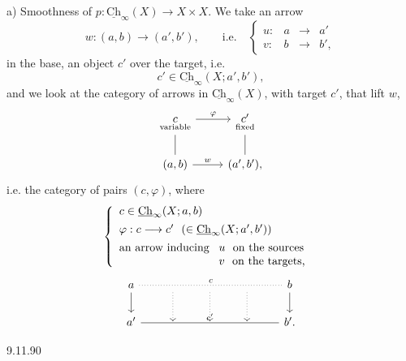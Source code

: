 \documentclass[11pt]{article}
\newcommand{\printedpage}[1]{\marginpar{\footnotesize p.~#1}}
\newcommand{\msp}[1]{\marginpar{\footnotesize [#1]}}
\newcommand{\Ch}{\underline{\mathrm{Ch}}}
\begin{document}
a) Smoothness of $p : \Ch_{\infty}(X) \longrightarrow X \times X$. We take an arrow
\[
w : (a,b) \longrightarrow (a',b'), \qquad \text{i.e.} \quad \left\{ \begin{array}{lccc} u : & a & \longrightarrow & a' \\[1ex] v : & b & \longrightarrow & b', \end{array} \right.
\]
in the base, an object $c'$ over the target, i.e.
\[
c' \in \Ch_{\infty}(X; a', b'),
\]
and we look at the category of arrows in $\Ch_{\infty}(X)$, with target $c'$, that lift $w$,
\[
\begin{tikzcd}
\underset{\text{\scriptsize variable}}{c} \arrow[r, "\varphi"] \arrow[d, dash] & \underset{\text{\scriptsize fixed}}{c'} \arrow[d, dash] \\
(a,b) \arrow[r, "w"] & (a',b'),
\end{tikzcd}
\]
\printedpage{90}
i.e. the category of pairs $(c,\varphi)$, where
\[
\left\{ \begin{array}{l}
c \in \Ch_{\infty}(X; a, b) \\[1ex]
\varphi : c \longrightarrow c' \ \ (\in \Ch_{\infty}(X; a', b')) \\[1ex]
\text{an arrow inducing } \begin{array}[t]{l} u \ \text{ on the sources} \\ v \ \text{ on the targets,} \end{array}
\end{array} \right.
\]
\[
\begin{tikzcd}
a \arrow[rrrr, dotted, dash, "c"] \arrow[d] & {} \arrow[d, dotted] & {} \arrow[d, dotted] & {} \arrow[d, dotted] & b \arrow[d] \\
a' \arrow[rrrr, dash, "c'"] & {} & {} & {} & b'.
\end{tikzcd}
\]

\msp{page 145}
\begin{flushright}
{\footnotesize 9.11.90}
\end{flushright}
\end{document}
